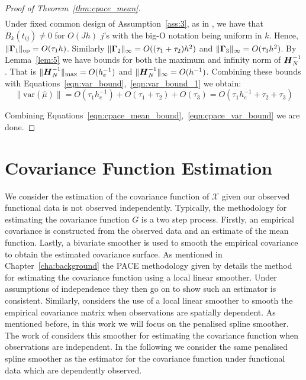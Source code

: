 \begin{proof}[Proof of Theorem~\ref{thm:cpace_mean}]
\begin{equation}
\begin{split}
	\end{split}
\label{eqn:var_bound}
\end{equation}
Under fixed common design of Assumption~\ref{ass:3}, as in \citep{xiao_asymptotic_2020}, we have that $B_k(t_{ij}) \ne 0$ for $O(Jh)$ $j$'s with the big-O notation being uniform in $k$.
Hence, $\lVert \bm{{\Gamma}}_{1}\rVert_{\text{op}}= O(\tau_1 h)$.
Similarly $\lVert \bm{{\Gamma}}_{2} \rVert_{\infty} = O(( \tau_1 + \tau_2 ) h^2)$ and $\lVert \bm{{\Gamma}}_{3}\rVert_{\infty} = O(\tau_3 h^2)$. 
By Lemma~\ref{lem:5} we have bounds for both the maximum and infinity norm of $\bm{{H}}_{N}^{-1}$.
That is $\lVert \bm{{H}}_{N}^{-1} \rVert_\text{max} = O(h_e^{-1})$ and $\lVert \bm{{H}}_{N}^{-1} \rVert_\infty= O(h^{-1})$.
Combining these bounds with Equations~\eqref{eqn:var_bound},~\eqref{eqn:var_bound_1} we obtain: 
\begin{equation}
	\lVert \text{var}\left(\hat{\mu}\right) \rVert = O(\tau_1 h_e^{-1}) + O(\tau_1 + \tau_2) + O(\tau_3) = O(\tau_1 h_e^{-1} + \tau_2 + \tau_3)
	\label{eqn:cpace_var_bound}
\end{equation}

Combining Equations~\eqref{eqn:cpace_mean_bound},~\eqref{eqn:cpace_var_bound} we are done.
\end{proof}

\section{Covariance Function Estimation \label{sec:cpace_eigen_estim}}
We consider the estimation of the covariance function of $\mathcal{X}$ given our observed functional data is not observed independently.
Typically, the methodology for estimating the covariance function $G$ is a two step process.
Firstly, an empirical covariance is constructed from the observed data and an estimate of the mean function.
Lastly, a bivariate smoother is used to smooth the empirical covariance to obtain the estimated covariance surface. 
As mentioned in Chapter~\ref{cha:background} the PACE methodology given by \citep{yao_functional_2005} details the method for estimating the covariance function using a local linear smoother. 
Under assumptions of independence they then go on to show such an estimator is consistent.
Similarly, \citep{liu_functional_2017} considers the use of a local linear smoother to smooth the empirical covariance matrix when observations are spatially dependent.
As mentioned before, in this work we will focus on the penalised spline smoother. 
The work of \citep{xiao_asymptotic_2020} considers this smoother for estimating the covariance function when observations are independent. 
In the following we consider the same penalised spline smoother as the estimator for the covariance function under functional data which are dependently observed.

